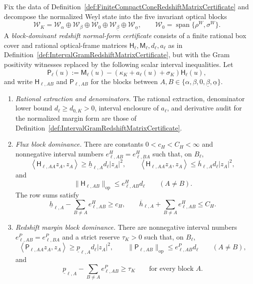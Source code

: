 \begin{definition}\label{def:BlockDominantRedshiftNormalFormCertificate}
Fix the data of Definition~\ref{def:FiniteCompactConeRedshiftMatrixCertificate}
and decompose the normalized Weyl state into the five invariant optical blocks
\[
    \mathcal W_K
    =
    \mathcal W_{\alpha}\oplus\mathcal W_{\beta}
    \oplus\mathcal W_{0}
    \oplus\mathcal W_{\underline\beta}
    \oplus\mathcal W_{\underline\alpha},
    \qquad
    \mathcal W_0=\operatorname{span}\{\rho^W,\sigma^W\}.
\]
A \emph{block-dominant redshift normal-form certificate} consists of a finite
rational box cover and rational optical-frame matrices
$\mathsf H_\ell,\mathsf M_\ell,d_\ell,a_\ell$ as in
Definition~\ref{def:IntervalGramRedshiftMatrixCertificate}, but with the Gram
positivity witnesses replaced by the following scalar interval inequalities.
Let
\[
    \mathsf P_\ell(u)
    :=
    \mathsf M_\ell(u)
    -
    (\kappa_K+a_\ell(u)+\sigma_K)\mathsf H_\ell(u),
\]
and write $\mathsf H_{\ell,AB}$ and $\mathsf P_{\ell,AB}$ for the blocks
between $A,B\in\{\alpha,\beta,0,\underline\beta,\underline\alpha\}$.
\begin{enumerate}
    \item \emph{Rational extraction and denominators.}  The rational extraction,
    denominator lower bound $d_\ell\ge d_{0,K}>0$, interval enclosure of
    $a_\ell$, and derivative audit for the normalized margin form are those of
    Definition~\ref{def:IntervalGramRedshiftMatrixCertificate}.

    \item \emph{Flux block dominance.}  There are constants
    $0<c_H<C_H<\infty$ and nonnegative interval numbers
    $e^H_{\ell,AB}=e^H_{\ell,BA}$ such that, on $B_\ell$,
    \[
        \left\langle \mathsf H_{\ell,AA}z_A,z_A\right\rangle
        \ge
        \underline h_{\ell,A}d_\ell |z_A|^2,
        \qquad
        \left\langle \mathsf H_{\ell,AA}z_A,z_A\right\rangle
        \le
        \overline h_{\ell,A}d_\ell |z_A|^2,
    \]
    and
    \[
        \|\mathsf H_{\ell,AB}\|_{\mathrm{op}}
        \le
        e^H_{\ell,AB}d_\ell
        \qquad(A\ne B).
    \]
    The row sums satisfy
    \[
        \underline h_{\ell,A}
        -
        \sum_{B\ne A}e^H_{\ell,AB}
        \ge c_H,
        \qquad
        \overline h_{\ell,A}
        +
        \sum_{B\ne A}e^H_{\ell,AB}
        \le C_H .
    \]

    \item \emph{Redshift margin block dominance.}  There are nonnegative interval
    numbers $e^P_{\ell,AB}=e^P_{\ell,BA}$ and a strict reserve $\tau_K>0$ such
    that, on $B_\ell$,
    \[
        \left\langle \mathsf P_{\ell,AA}z_A,z_A\right\rangle
        \ge
        \underline p_{\ell,A}d_\ell |z_A|^2,
        \qquad
        \|\mathsf P_{\ell,AB}\|_{\mathrm{op}}
        \le
        e^P_{\ell,AB}d_\ell
        \qquad(A\ne B),
    \]
    and
    \[
        \underline p_{\ell,A}
        -
        \sum_{B\ne A}e^P_{\ell,AB}
        \ge
        \tau_K
        \qquad\text{for every block }A.
    \]


\end{enumerate}
\end{definition}

